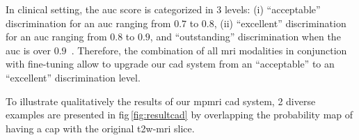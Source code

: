 In clinical setting, the \ac{auc} score is categorized in 3 levels:
(i) ``acceptable'' discrimination for an \ac{auc} ranging from $0.7$
to $0.8$, (ii) ``excellent'' discrimination for an \ac{auc} ranging
from $0.8$ to $0.9$, and ``outstanding'' discrimination when the
\ac{auc} is over $0.9$~\cite{hosmer2004applied}.
Therefore, the combination of all \ac{mri} modalities in conjunction
with fine-tuning allow to upgrade our \ac{cad} system from an
``acceptable'' to an ``excellent'' discrimination level.

To illustrate qualitatively the results of our \ac{mpmri} \ac{cad}
system, 2 diverse examples are presented in
\acs{fig}\,\ref{fig:resultcad} by overlapping the probability map of
having a \ac{cap} with the original \ac{t2w}-\ac{mri} slice.
